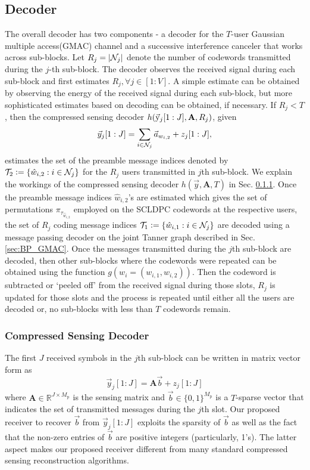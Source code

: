 \subsection{Decoder}
The overall decoder has two components - a decoder for the $T$-user Gaussian multiple access(GMAC) channel and a successive interference canceler that works across sub-blocks. Let $R_j=|\mathcal{N}_j|$ denote the number of codewords transmitted during the $j$-th sub-block. The decoder observes the received signal during each sub-block and first estimates $R_j, \forall j \in [1:V]$. A simple estimate can be obtained by observing the energy of the received signal during each sub-block, but more sophisticated estimates based on decoding can be obtained, if necessary. 
\iflonger
If $R_j < T$, then the compressed sensing decoder $h(\vec{\mathrm{y}}_j[1:J],\mathbf{A},R_j)$, given
\[
\vec{y}_{j}[1:J]=\sum_{i\in\mc{N}_j} \vec{a}_{w_{i,2}}+z_{j}[1:J], %
\label{eq:cross_correlation}
\]
estimates the set of the preamble message indices denoted by $\mathcal{T}_2\mathrel{\mathop:}=\{\hat{w}_{i,2}:i\in\mathcal{N}_j\}$ for the $R_j$ users transmitted in $j$th sub-block. We explain the workings of the compressed sensing decoder $h(\vec{y},\mathbf{A},T)$ in Sec. \ref{sec:CS_decoder}. Once the preamble message indices $\hat{w}_{i,2}$'s are estimated which gives the set of permutations $\pi_{\tau_{\hat{w}_{i,2}}}$ employed on the SCLDPC codewords at the respective users, the set of $R_j$ coding message indices $\mathcal{T}_1\mathrel{\mathop:}=\{\hat{w}_{i,1}:i\in\mathcal{N}_j\}$ are decoded using a message passing decoder on the joint Tanner graph described in Sec. \ref{sec:BP_GMAC}. Once the messages transmitted during the $j$th sub-block are decoded, then other sub-blocks where the codewords were repeated can be obtained using the function $g(w_i=(w_{i,1},w_{i,2}))$. Then the codeword is subtracted or `peeled off' from the received signal during those slots, $R_j$ is updated for those slots and the process is repeated until either all the users are decoded or, no sub-blocks with less than $T$ codewords remain.\\
\fi

\subsubsection{Compressed Sensing Decoder}
\label{sec:CS_decoder}
The first $J$ received symbols in the $j$th sub-block can be written in matrix vector form as
\begin{equation}
\label{eq:cross_correlation}
\vec{y}_{j}[1:J] = \mathbf{A}\vec{b}+z_{j}[1:J]
\end{equation}
where $\mathbf{A} \in \mathbb{R}^{J \times M_\mathrm{p}}$ is the sensing matrix and $\vec{b} \in \{0,1\}^{M_\mathrm{p}}$ is a $T$-sparse vector that indicates the set of transmitted messages during the $j$th slot. Our proposed receiver to recover $\vec{b}$ from $\vec{y}_{j}[1:J]$ exploits the sparsity of $\vec{b}$ as well as the fact that the non-zero entries of $\vec{b}$ are positive integers (particularly, 1's). The latter aspect makes our proposed receiver different from many standard compressed sensing reconstruction algorithms.

